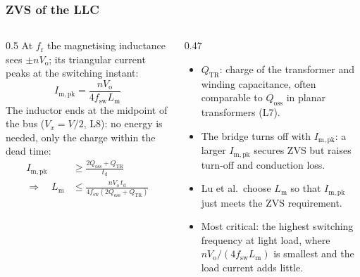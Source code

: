 \begin{frame}
	\frametitle{ZVS of the LLC}
	\begin{columns}[T]
		\begin{column}{0.5\textwidth}
			\small
			At $f_\mathrm{r}$ the magnetising inductance sees $\pm nV_\mathrm{o}$; its triangular current peaks at the switching instant:
			\begin{equation*}
				I_\mathrm{m,pk}=\frac{nV_\mathrm{o}}{4f_\mathrm{sw}L_\mathrm{m}}
			\end{equation*}
			The inductor ends at the midpoint of the bus ($V_x=V/2$, L8): no energy is needed, only the charge within the dead time:
			\begin{align*}
				I_\mathrm{m,pk}               & \geq\frac{2Q_\mathrm{oss}+Q_\mathrm{TR}}{t_\mathrm{d}}                                    \\
				\Rightarrow\quad L_\mathrm{m} & \leq\frac{nV_\mathrm{o}\,t_\mathrm{d}}{4f_\mathrm{sw}(2Q_\mathrm{oss}+Q_\mathrm{TR})}
			\end{align*}
		\end{column}
		\begin{column}{0.47\textwidth}
			\small
			\begin{itemize}
				\item $Q_\mathrm{TR}$: charge of the transformer and winding capacitance, often comparable to $Q_\mathrm{oss}$ in planar transformers (L7).
				\item The bridge turns off with $I_\mathrm{m,pk}$: a larger $I_\mathrm{m,pk}$ secures ZVS but raises turn-off and conduction loss.
				\item Lu et al.\ choose $L_\mathrm{m}$ so that $I_\mathrm{m,pk}$ just meets the ZVS requirement.
				\item Most critical: the highest switching frequency at light load, where $nV_\mathrm{o}/(4f_\mathrm{sw}L_\mathrm{m})$ is smallest and the load current adds little.
			\end{itemize}
		\end{column}
	\end{columns}
\end{frame}

